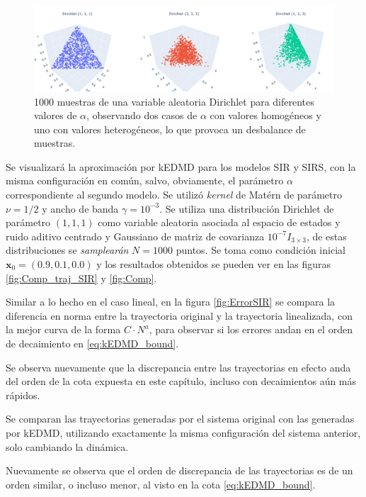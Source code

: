 \begin{figure}[htbp]
    \centering
    \includegraphics[width=0.95\linewidth]{img/content/chapter3/Dirichlet.pdf}
    \caption{1000 muestras de una variable aleatoria Dirichlet para diferentes valores de $\alpha$, observando dos casos de $\alpha$ con valores homogéneos y uno con valores heterogéneos, lo que provoca un desbalance de muestras.}
    \label{fig:Dirichlet_samples}
\end{figure}

Se visualizará la aproximación por kEDMD para los modelos SIR y SIRS, con la misma configuración en común, salvo, obviamente, el parámetro $\alpha$ correspondiente al segundo modelo. Se utilizó \textit{kernel} de Matérn de parámetro $\nu=1/2$ y ancho de banda $\gamma=10^{-3}$. Se utiliza una distribución Dirichlet de parámetro $(1,1,1)$ como variable aleatoria asociada al espacio de estados y ruido aditivo centrado y Gaussiano de matriz de covarianza $10^{-7} I_{3 \times 3}$, de estas distribuciones se \textit{samplearán} $N=1000$ puntos. Se toma como condición inicial $\mathbf{x}_0 = (0.9, 0.1, 0.0)$ y los resultados obtenidos se pueden ver en las figuras \ref{fig:Comp_traj_SIR} y \ref{fig:Comp}. 

Similar a lo hecho en el caso lineal, en la figura \ref{fig:ErrorSIR} se compara la diferencia en norma entre la trayectoria original y la trayectoria linealizada, con la mejor curva de la forma $C \cdot N^{a}$, para observar si los errores andan en el orden de decaimiento en \eqref{eq:kEDMD_bound}.

Se observa nuevamente que la discrepancia entre las trayectorias en efecto anda del orden de la cota expuesta en este capítulo, incluso con decaimientos aún más rápidos.

Se comparan las trayectorias generadas por el sistema original con las generadas por kEDMD, utilizando exactamente la misma configuración del sistema anterior, solo cambiando la dinámica.

Nuevamente se observa que el orden de discrepancia de las trayectorias es de un orden similar, o incluso menor, al visto en la cota \ref{eq:kEDMD_bound}.